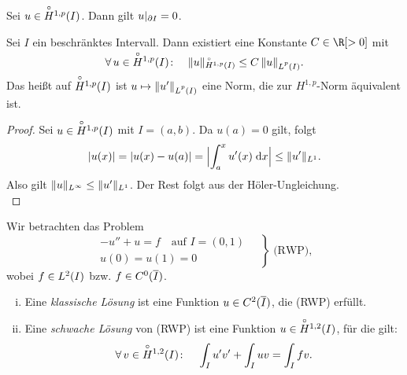 \begin{thSatz}
    Sei $u\in\SobHIo$. Dann gilt $u\vert_{\setboundary{I}} = 0$.
\end{thSatz}


\begin{thSatz}
    Sei $I$ ein beschränktes Intervall. Dann existiert eine Konstante
    $C\in\R[>0]$ mit
    \[ \forall\,u\in\SobHIo\colon\quad
        \norm{u}_{\SobHIo} \leq C\, \norm{u}_{\Lpp(I)}
    . \]
    Das heißt auf $\SobHIo$ ist $u\mapsto \norm{u'}_{\Lpp(I)}$ eine Norm,
    die zur $H^{1,p}$-Norm äquivalent ist.
\end{thSatz}

\begin{proof}
    Sei $u\in\SobHIo$ mit $I=(a,b)$. Da $u(a) = 0$ gilt, folgt
    \[ \abs{u(x)} = \abs{u(x)-u(a)}
        = \abs[\Big]{\int_a^x u'(x) \dif{x}}
        \leq \norm{u'}_{\Lp1}
    . \]
    Also gilt $\norm{u}_{\Lp\infty} \leq \norm{u'}_{\Lp1}$. Der Rest folgt aus
    der Höler-Ungleichung.
    \\
\end{proof}

\begin{thEmpty}[Randwertproblem]
    Wir betrachten das Problem
    \[ \left. \begin{gathered}
            -u''+u=f  \quad \text{auf $I=(0,1)$} \\
            u(0) = u(1) = 0
        \end{gathered} \quad \right\} \; \text{(RWP)}
    , \]
    wobei $f\in\Lp2(I)$ bzw. $f\in C^0(\setclosure I)$.
    
    \nnDef
    \begin{enumerate}[(i)]
        \item
            Eine \emph{klassische Lösung} ist eine Funktion
            $u\in C^2(\setclosure I)$, die (RWP) erfüllt.
            
        \item
            Eine \emph{schwache Lösung} von (RWP) ist eine Funktion
            $u\in\SobHIo[2]$, für die gilt:
            \[ \forall\,v\in\SobHIo[2]\colon\quad
                \int_I u'v' + \int_I uv = \int_I fv
            . \]
    \end{enumerate}
\end{thEmpty}

